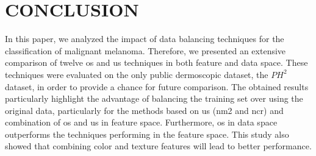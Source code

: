 \graphicspath{ {./content/Experiments-results/figures/} }

\section{\uppercase{Conclusion}}
\label{sec:cons} 

\noindent In this paper, we analyzed the impact of data balancing techniques for the classification of malignant melanoma. 
Therefore, we presented an extensive comparison of twelve \ac{os} and \ac{us} techniques in both feature and data space. 
These techniques were evaluated on the only public dermoscopic dataset, the $PH^{2}$ dataset, in order to provide a chance for future comparison.
The obtained results particularly highlight the advantage of balancing the training set over using the original data, particularly for the methods based on \ac{us} (\ac{nm2} and \ac{ncr}) and combination of \ac{os} and \ac{us} in feature space.
Furthermore, \ac{os} in data space outperforms the techniques performing in the feature space.
This study also showed that combining color and texture features will lead to better performance. 



